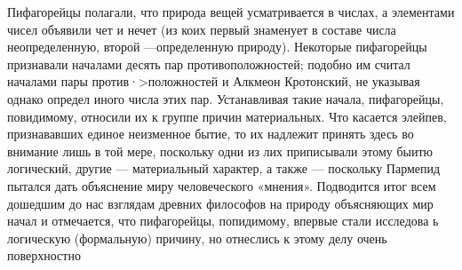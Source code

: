 \documentclass{article}
\begin{document}
Пифагорейцы полагали, что природа вещей усматривается в числах, а элементами чисел объявили чет и нечет (из коих первый знаменует в составе числа неопределенную, второй —определенную природу). Некоторые пифагорейцы признавали началами десять пар противоположностей; подобно им считал началами пары против·>положностей и Алкмеон Кротонский, не указывая однако определ иного числа этих пар. Устанавливая такие начала, пифагорейцы, повидимому, относили их к группе причин материальных. Что касается элейпев, признававших единое неизменное бытие, то их надлежит принять здесь во внимание лишь в той мере, поскольку одни из лих приписывали этому быитю логический, другие — материальный характер, а также — поскольку Пармепид пытался дать объяснение миру человеческого «мнения». Подводится итог всем дошедшим до нас взглядам древних философов на природу объясняющих мир начал и отмечается, что пифагорейцы, попидимому, впервые стали исследова ь логическую (формальную) причину, но отнеслись к этому делу очень поверхностно
\end{document}
